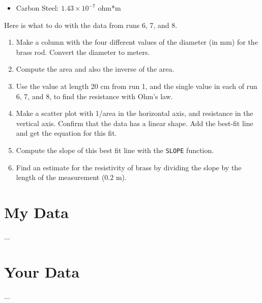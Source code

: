 \begin{itemize}
	\item Carbon Steel: $1.43 \times 10^{-7}$ ohm*m
\end{itemize}
Here is what to do with the data from runs 6, 7, and 8.
\begin{enumerate}
	\item Make a column with the four different values of the diameter (in mm) for the brass rod. Convert the diameter to meters.
	\item Compute the area and also the inverse of the area.
	\item Use the value at length 20 cm from run 1, and the single value in each of run 6, 7, and 8, to find the resistance with Ohm's law.
	\item Make a scatter plot with 1/area in the horizontal axis, and resistance in the vertical axis. Confirm that the data has a linear shape. Add the best-fit line and get the equation for this fit.
	\item Compute the slope of this best fit line with the \texttt{SLOPE} function.
	\item Find an estimate for the resistivity of brass by dividing the slope by the length of the measurement (0.2 m).
\end{enumerate}
\section{My Data}
...
\section{Your Data}
...
